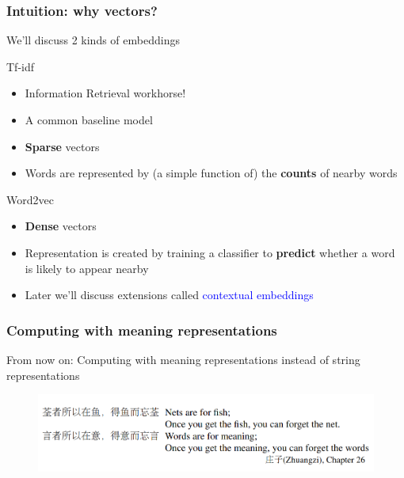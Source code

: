 \documentclass[13.5pt,aspecratio=169, xcolor=dvipsnames]{beamer}
\begin{document}
    \begin{frame}
        \onehalfspacing
            \frametitle{Intuition: why vectors?}
            We'll discuss 2 kinds of embeddings
            \begin{block}{Tf-idf}
                \begin{itemize}
                    \item Information Retrieval workhorse!
                    \item A common baseline model
                    \item \textbf{Sparse} vectors
                    \item Words are represented by (a simple function of) the \textbf{counts} of nearby words
                \end{itemize}
            \end{block}
            \begin{block}{Word2vec}
                \begin{itemize}
                    \item \textbf{Dense} vectors
                    \item Representation is created by training a classifier to \textbf{predict} whether a
                    word is likely to appear nearby
                    \item Later we'll discuss extensions called \textcolor{blue}{contextual embeddings}
                \end{itemize}
            \end{block}
    

        \end{frame}



        \begin{frame}
            \onehalfspacing
                \frametitle{Computing with meaning representations}
                {\Large
                From now on:
Computing with meaning representations
instead of string representations}
                \begin{figure}[h]
                    \centering
                    \includegraphics[width=\linewidth]{meaning_representations.png}
                \end{figure}
            
            \end{frame}
                
\end{document}
